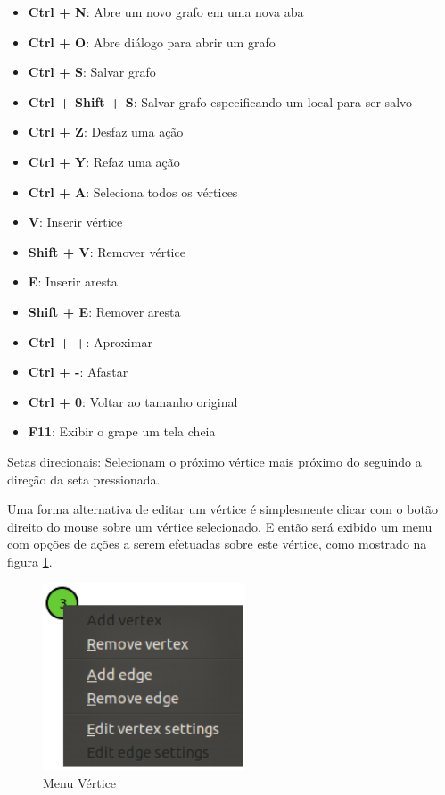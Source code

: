 \documentclass[a4paper]{abnt}
\begin{document}
\begin{itemize}
    \item \textbf{Ctrl + N}: Abre um novo grafo em uma nova aba
    \item \textbf{Ctrl + O}: Abre diálogo para abrir um grafo
    \item \textbf{Ctrl + S}: Salvar grafo
    \item \textbf{Ctrl + Shift + S}: Salvar grafo especificando um local para ser salvo
    \item \textbf{Ctrl + Z}: Desfaz uma ação
    \item \textbf{Ctrl + Y}: Refaz uma ação
    \item \textbf{Ctrl + A}: Seleciona todos os vértices
    \item \textbf{V}: Inserir vértice
    \item \textbf{Shift + V}: Remover vértice
    \item \textbf{E}: Inserir aresta
    \item \textbf{Shift + E}: Remover aresta
    \item \textbf{Ctrl + +}: Aproximar
    \item \textbf{Ctrl + -}: Afastar
    \item \textbf{Ctrl + 0}: Voltar ao tamanho original
    \item \textbf{F11}: Exibir o grape um tela cheia
\end{itemize}

Setas direcionais: Selecionam o próximo vértice mais próximo do seguindo a direção da seta pressionada.

Uma forma alternativa de editar um vértice é simplesmente clicar com o botão direito do mouse sobre um vértice selecionado, E então será exibido um menu com opções de ações a serem efetuadas sobre este vértice, como mostrado na figura \ref{img_vertex_context_menu}.

\begin{figure}[htb]
    \centering
	\includegraphics[width=6cm]{vertex_context_menu.png}
	\caption{Menu Vértice}
	\label{img_vertex_context_menu}
\end{figure}
\end{document}
